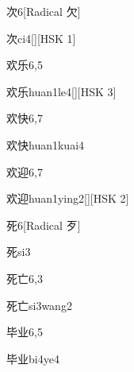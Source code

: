 \begin{entry}{次}{6}[Radical ⽋]
  \begin{phonetics}{次}{ci4}[][HSK 1]
  \end{phonetics}
\end{entry}

\begin{entry}{欢乐}{6,5}
  \begin{phonetics}{欢乐}{huan1le4}[][HSK 3]
  \end{phonetics}
\end{entry}

\begin{entry}{欢快}{6,7}
  \begin{phonetics}{欢快}{huan1kuai4}
  \end{phonetics}
\end{entry}

\begin{entry}{欢迎}{6,7}
  \begin{phonetics}{欢迎}{huan1ying2}[][HSK 2]
  \end{phonetics}
\end{entry}

\begin{entry}{死}{6}[Radical 歹]
  \begin{phonetics}{死}{si3}
  \end{phonetics}
\end{entry}

\begin{entry}{死亡}{6,3}
  \begin{phonetics}{死亡}{si3wang2}
  \end{phonetics}
\end{entry}

\begin{entry}{毕业}{6,5}
  \begin{phonetics}{毕业}{bi4ye4}
  \end{phonetics}
\end{entry}


